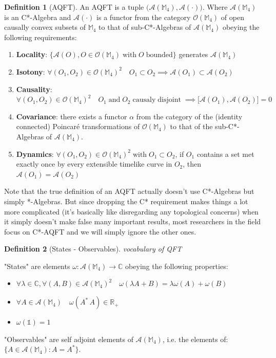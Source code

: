 \documentclass[a4paper,11pt]{article}
\numberwithin{equation}{section}
\theoremstyle{definition}
\newtheorem{definition}{Definition}
\begin{document}
\begin{definition}[AQFT]
    An AQFT is a tuple $\big(\mathcal{A}(\mathbb{M}_4), \mathcal{A}(\cdot)\big)$. Where $\mathcal{A}(\mathbb{M}_4)$ is an C*-Algebra and $\mathcal{A}(\cdot)$ is a functor from the category $\mathcal{O}(\mathbb{M}_4)$ of open causally convex subsets of $\mathbb{M}_4$ to that of sub-C*-Algebras of $\mathcal{A}(\mathbb{M}_4)$ obeying the following requirements:
    \begin{enumerate}
        \item \textbf{Locality}:  $\big\{\mathcal{A}(O), O \in \mathcal{O}(\mathbb{M}_4) \; \mathrm{with}\; O\; \mathrm{bounded}\big\}$ generates $\mathcal{A}(\mathbb{M}_4)$
        \item \textbf{Isotony}: $\forall (O_1, O_2) \in \mathcal{O}(\mathbb{M}_4)^2 \quad O_1\subset O_2 \implies \mathcal{A}(O_1)\subset\mathcal{A}(O_2)$
        \item \textbf{Causality}: $\forall (O_1, O_2) \in \mathcal{O}(\mathbb{M}_4)^2 \quad O_1 \; \mathrm{and}\; O_2\; \mathrm{causaly}\;\mathrm{disjoint}\; \implies \big[\mathcal{A}(O_1),\mathcal{A}(O_2)\big]=0$
        \item \textbf{Covariance}: there exists a functor $\alpha$ from the category of the (identity connected) Poincaré transformations of $\mathcal{O}(\mathbb{M}_4)$ to that of the sub-C*-Algebras of $\mathcal{A}(\mathbb{M}_4)$.
        \item \textbf{Dynamics}: $\forall (O_1, O_2) \in \mathcal{O}(\mathbb{M}_4)^2 \;\mathrm{with} \;O_1 \subset O_2$, if $O_1$ contains a set met exactly once by every extensible timelike curve in $O_2$, then $\mathcal{A}(O_1)=\mathcal{A}(O_2)$
    \end{enumerate}
Note that the true definition of an AQFT actually doesn't use C*-Algebras but simply *-Algebras. But since dropping the C* requirement makes things a lot more complicated (it's basically like disregarding any topological concerns) when it simply doesn't make false many important results, most researchers in the field focus on C*-AQFT and we will simply ignore the other ones.
\end{definition}

\begin{definition}[States - Observables] \emph{vocabulary of QFT}

"States" are elements $\omega: \mathcal{A}(\mathbb{M}_4)\to\mathbb{C}$ obeying the following properties:
\begin{itemize}
    \item $\forall \lambda\in\mathbb{C}, \forall(A,B)\in\mathcal{A}(\mathbb{M}_4)^2\quad \omega(\lambda A+B)=\lambda \omega(A)+\omega(B)$
    \item $\forall A \in \mathcal{A}(\mathbb{M}_4)\quad \omega(A^*\, A)\in \mathbb{R}_+$
    \item $\omega(\mathds{1})=1$
\end{itemize}

"Observables" are self adjoint elements of $\mathcal{A}(\mathbb{M}_4)$, i.e. the elements of: $\{A \in\mathcal{A}(\mathbb{M}_4):A=A^*\}$.
\end{definition}
\end{document}
